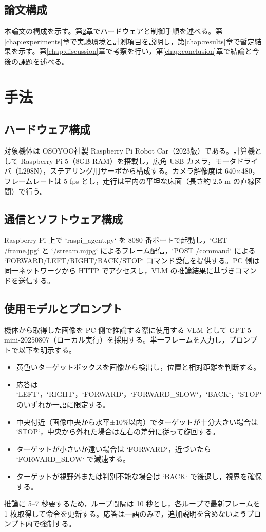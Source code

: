 \documentclass[a4paper,11pt]{ltjsreport}
\begin{document}
\section{論文構成}
本論文の構成を示す。第\ref{chap:method}章でハードウェアと制御手順を述べる。第\ref{chap:experiments}章で実験環境と計測項目を説明し，第\ref{chap:results}章で暫定結果を示す。第\ref{chap:discussion}章で考察を行い，第\ref{chap:conclusion}章で結論と今後の課題を述べる。

\chapter{手法}
\label{chap:method}

\section{ハードウェア構成}
対象機体は OSOYOO社製 Raspberry Pi Robot Car（2023版）である。計算機として Raspberry Pi 5（8GB RAM）を搭載し，広角 USB カメラ，モータドライバ（L298N），ステアリング用サーボから構成する。カメラ解像度は 640×480，フレームレートは 5 fps とし，走行は室内の平坦な床面（長さ約 2.5 m の直線区間）で行う。

\section{通信とソフトウェア構成}
Raspberry Pi 上で `raspi\_agent.py` を 8080 番ポートで起動し，`GET /frame.jpg` と `/stream.mjpg` によるフレーム配信，`POST /command` による `FORWARD/LEFT/RIGHT/BACK/STOP` コマンド受信を提供する。PC 側は同一ネットワークから HTTP でアクセスし，VLM の推論結果に基づきコマンドを送信する。

\section{使用モデルとプロンプト}
機体から取得した画像を PC 側で推論する際に使用する VLM として GPT-5-mini-20250807（ローカル実行）を採用する。単一フレームを入力し，プロンプトで以下を明示する。
\begin{itemize}
  \item 黄色いターゲットボックスを画像から検出し，位置と相対距離を判断する。
  \item 応答は `LEFT`，`RIGHT`，`FORWARD`，`FORWARD\_SLOW`，`BACK`，`STOP` のいずれか一語に限定する。
  \item 中央付近（画像中央から水平±10\%以内）でターゲットが十分大きい場合は `STOP`，中央から外れた場合は左右の差分に従って旋回する。
  \item ターゲットが小さいか遠い場合は `FORWARD`，近づいたら `FORWARD\_SLOW` で減速する。
  \item ターゲットが視野外または判別不能な場合は `BACK` で後退し，視界を確保する。
\end{itemize}
推論に 5--7 秒要するため，ループ間隔は 10 秒とし，各ループで最新フレームを 1 枚取得して命令を更新する。応答は一語のみで，追加説明を含めないようプロンプト内で強制する。
\end{document}

